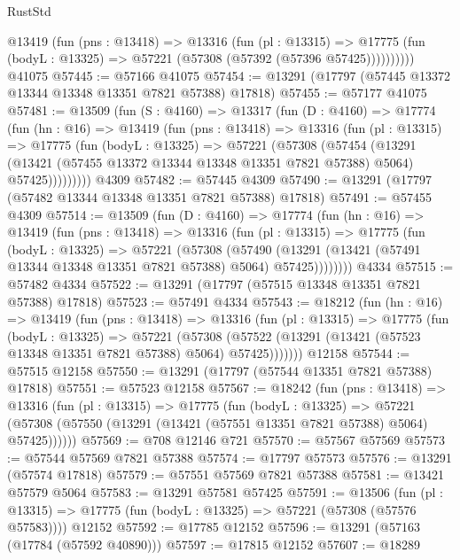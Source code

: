 \begin{lexlean}{RustStd}
\begin{coremodule}
          @13419
            (fun (pns : @13418) =>
            @13316
              (fun (pl : @13315) =>
              @17775 (fun (bodyL : @13325) => @57221 (@57308 (@57392 (@57396 @57425))))))))))
    @41075
@57445 := @57166 @41075
@57454 := @13291 (@17797 (@57445 @13372 @13344 @13348 @13351 @7821 @57388) @17818)
@57455 := @57177 @41075
@57481 := @13509
    (fun (S : @4160) =>
    @13317
      (fun (D : @4160) =>
      @17774
        (fun (hn : @16) =>
        @13419
          (fun (pns : @13418) =>
          @13316
            (fun (pl : @13315) =>
            @17775
              (fun (bodyL : @13325) =>
              @57221
                (@57308
                  (@57454
                    (@13291
                      (@13421 (@57455 @13372 @13344 @13348 @13351 @7821 @57388) @5064)
                      @57425)))))))))
    @4309
@57482 := @57445 @4309
@57490 := @13291 (@17797 (@57482 @13344 @13348 @13351 @7821 @57388) @17818)
@57491 := @57455 @4309
@57514 := @13509
    (fun (D : @4160) =>
    @17774
      (fun (hn : @16) =>
      @13419
        (fun (pns : @13418) =>
        @13316
          (fun (pl : @13315) =>
          @17775
            (fun (bodyL : @13325) =>
            @57221
              (@57308
                (@57490
                  (@13291 (@13421 (@57491 @13344 @13348 @13351 @7821 @57388) @5064) @57425))))))))
    @4334
@57515 := @57482 @4334
@57522 := @13291 (@17797 (@57515 @13348 @13351 @7821 @57388) @17818)
@57523 := @57491 @4334
@57543 := @18212
    (fun (hn : @16) =>
    @13419
      (fun (pns : @13418) =>
      @13316
        (fun (pl : @13315) =>
        @17775
          (fun (bodyL : @13325) =>
          @57221
            (@57308 (@57522 (@13291 (@13421 (@57523 @13348 @13351 @7821 @57388) @5064) @57425)))))))
    @12158
@57544 := @57515 @12158
@57550 := @13291 (@17797 (@57544 @13351 @7821 @57388) @17818)
@57551 := @57523 @12158
@57567 := @18242
    (fun (pns : @13418) =>
    @13316
      (fun (pl : @13315) =>
      @17775
        (fun (bodyL : @13325) =>
        @57221 (@57308 (@57550 (@13291 (@13421 (@57551 @13351 @7821 @57388) @5064) @57425))))))
@57569 := @708 @12146 @721
@57570 := @57567 @57569
@57573 := @57544 @57569 @7821 @57388
@57574 := @17797 @57573
@57576 := @13291 (@57574 @17818)
@57579 := @57551 @57569 @7821 @57388
@57581 := @13421 @57579 @5064
@57583 := @13291 @57581 @57425
@57591 := @13506
    (fun (pl : @13315) => @17775 (fun (bodyL : @13325) => @57221 (@57308 (@57576 @57583))))
    @12152
@57592 := @17785 @12152
@57596 := @13291 (@57163 (@17784 (@57592 @40890)))
@57597 := @17815 @12152
@57607 := @18289

\end{coremodule}
\end{lexlean}

